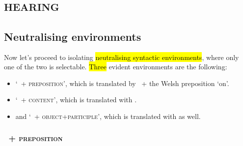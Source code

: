 \section{\textsc{hearing}}


\subsection{Neutralising environments}

\begin{paper}
	{\click} Now let's proceed to isolating \hl{neutralising syntactic environments}, where only one of the two is selectable. \hl{Three} evident environments are the following:
	\begin{itemize}
		\item {\click} ‘\shama~+ \textsc{preposition}’, which is translated by ~+ the Welsh preposition  ‘on’. 
		\item {\click} ‘\shama~+ \textsc{content}’, which is translated with . 
		\item and {\click} ‘\shama~+ \textsc{object}+\textsc{participle}’, which is translated with  as well. 
	\end{itemize}
\end{paper}

\subsubsection{\shama~+ \textsc{preposition}}

